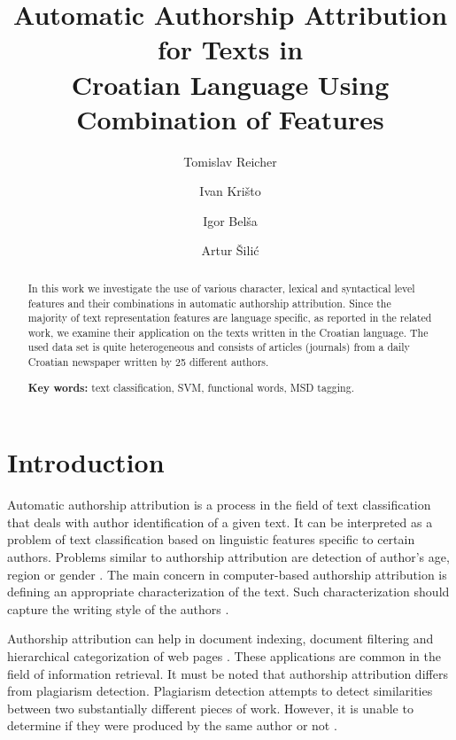 \documentclass{llncs}
\begin{document}
\title{Automatic Authorship Attribution for Texts in\\Croatian Language Using
Combination of Features}
\author{Tomislav Reicher \and Ivan Krišto \and Igor Belša \and Artur Šilić}

\maketitle

\begin{abstract}
In this work we investigate the use of various character, lexical and syntactical
level features and their combinations in automatic authorship attribution. Since
the majority of text representation features are language
specific, as reported in the related work, we examine their application on the texts written in 
the Croatian language. The used data set is quite heterogeneous and consists of articles (journals)
from a daily Croatian newspaper written by 25 different authors.

\vspace{10pt}
\textbf{Key words:} text classification, SVM, functional words, MSD tagging.
\end{abstract}


\section{Introduction}
Automatic authorship attribution is a process in the field of text classification
that deals with author identification of a given text. It can
be interpreted as a problem of text classification based on linguistic features
specific to certain authors. Problems similar to authorship attribution are
detection of author's age, region or gender \cite{luyckx2005shallow}. The main
concern in computer-based authorship attribution is defining an appropriate
characterization of the text. Such characterization should capture the writing
style of the authors \cite{coyotl2006authorship}.

Authorship attribution can help in document indexing, document filtering and
hierarchical categorization of web pages \cite{luyckx2005shallow}. These
applications are common in the field of information retrieval. 
It must be noted that authorship attribution differs from plagiarism
detection. Plagiarism detection attempts to detect similarities between two substantially different pieces of
work. However, it is unable to determine if they were produced by the same author or not
\cite{de2001mining}.
\end{document}
